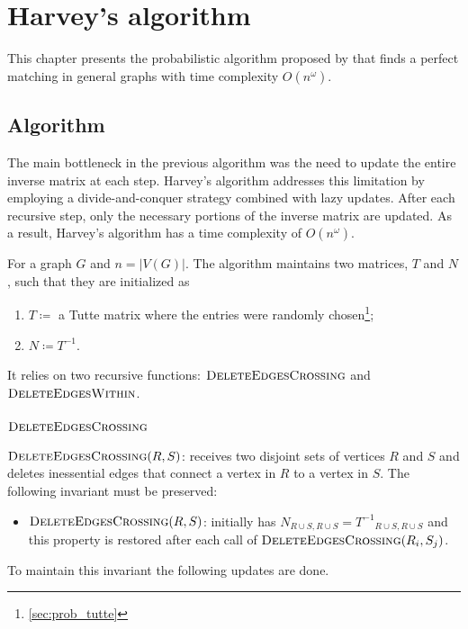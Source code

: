 \chapter{Harvey's algorithm}
\label{chap:harvey}

This chapter presents the probabilistic algorithm proposed by \citet{Harvey:Paper} that finds a perfect matching in general graphs with time complexity \(O(n^\omega)\).

\section{Algorithm}

The main bottleneck in the previous algorithm was the need to update the entire inverse matrix at each step. 
Harvey's algorithm addresses this limitation by employing a divide-and-conquer strategy combined with lazy updates. 
After each recursive step, only the necessary portions of the inverse matrix are updated.
As a result, Harvey's algorithm has a time complexity of \(O(n^\omega)\).

For a graph \(G\) and \(n = |V(G)|\). 
The algorithm maintains two matrices, \(T\) and \(N\), such that they are initialized as
\begin{enumerate}
    \item \(T \coloneqq \) a Tutte matrix where the entries were randomly chosen\footnote{\cref{sec:prob_tutte}};
    \item \(N \coloneqq T^{-1}\).
\end{enumerate}
It relies on two recursive functions: \(\textsc{DeleteEdgesCrossing}\) and \(\textsc{DeleteEdgesWithin}\). 

\subsection{\(\textsc{DeleteEdgesCrossing}\)}

$\textsc{DeleteEdgesCrossing}(R, S)$: receives two disjoint sets of vertices \(R\) and \(S\) and 
deletes inessential edges that connect a vertex in \(R\) to a vertex in \(S\).
The following invariant must be preserved:
\begin{itemize}
    \item \(\textsc{DeleteEdgesCrossing}(R, S)\): initially has \(N_{R \cup S, R \cup S} = {T^{-1}}_{R \cup S, R \cup S}\) and this property is restored after each call 
    of \(\textsc{DeleteEdgesCrossing}(R_i, S_j)\).
\end{itemize}
To maintain this invariant the following updates are done. 

